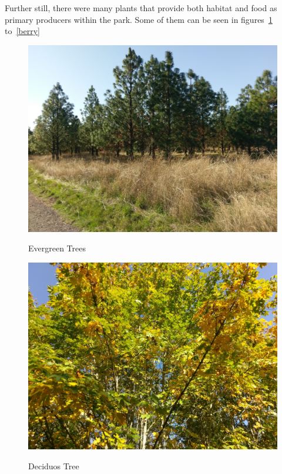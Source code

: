 \documentclass{article}
\begin{document}
Further still, there were many plants that provide both habitat and food as primary 
producers within the park. Some of them can be seen in figures~\ref{barkless} to~\ref{berry}
\begin{figure}[H]
\centering{}
\caption{Evergreen Trees}
\includegraphics[scale=0.07]{some_evergreens.jpg}
\label{barkless}
\end{figure}

\begin{figure}[H]
\centering{}
\caption{Deciduos Tree}
\includegraphics[scale=0.07]{fall_leaves.jpg}
\label{}
\end{figure}
\end{document}

